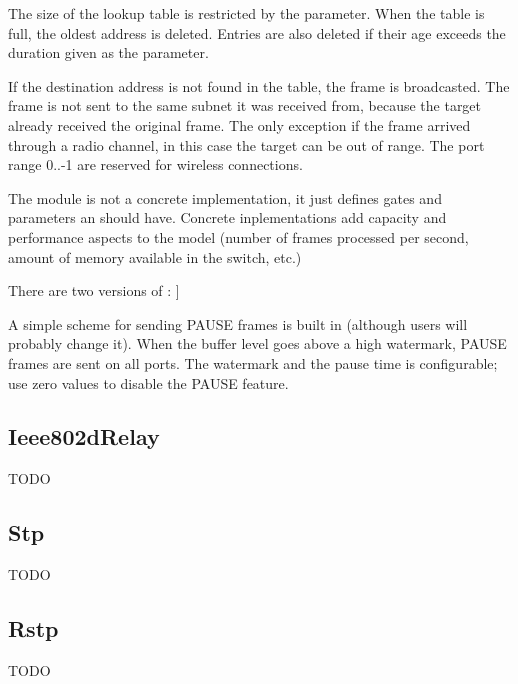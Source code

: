 
The size of the lookup table is restricted by the  parameter.
When the table is full, the oldest address is deleted. Entries are also deleted
if their age exceeds the duration given as the  parameter.

If the destination address is not found in the table, the frame is broadcasted.
The frame is not sent to the same subnet it was received from, because the
target already received the original frame. The only exception if the frame
arrived through a radio channel, in this case the target can be out of range.
The port range 0..-1 are reserved for wireless connections.

The  module is not a concrete implementation,
it just defines gates and parameters an  should have.
Concrete inplementations add
capacity and performance aspects to the model (number of frames processed
per second, amount of memory available in the switch, etc.)

There are two versions of : ]

A simple scheme for sending PAUSE frames is built in (although
users will probably change it). When the buffer level goes
above a high watermark, PAUSE frames are sent on all ports.
The watermark and the pause time is configurable; use zero
values to disable the PAUSE feature.

\subsection{Ieee802dRelay}

 TODO

\subsection{Stp}

 TODO

\subsection{Rstp}

 TODO


